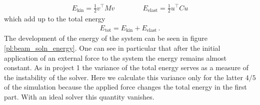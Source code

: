 \documentclass{report}
\newcounter{constant}
\begin{document}
\begin{align*}
	E_{\text{kin}} = \frac{1}{2}v^\top Mv
	\qquad\qquad E_{\text{elast}} = \frac{1}{2}u^\top Cu
\end{align*}
which add up to the total energy
\begin{align*}
	E_{\text{tot}}=E_{\text{kin}}+E_{\text{elast}}\,.
\end{align*}
The development of the energy of the system can be seen in figure \ref{pl:beam_soln_energy}. One can see in particular that after the initial application of an external force to the system the energy remains almost constant. As in project 1 the variance of the total energy serves as a measure of the instability of the solver. Here we calculate this variance only for the latter $4/5$ of the simulation because the applied force changes the total energy in the first part.
With an ideal solver this quantity vanishes.
\end{document}
